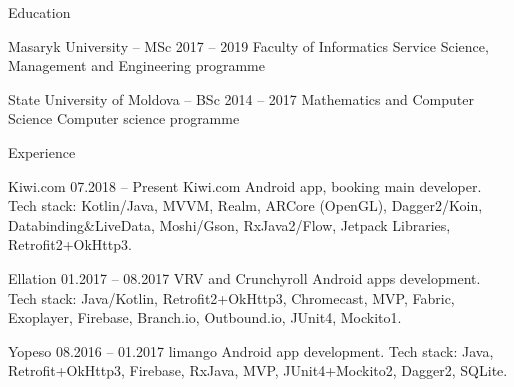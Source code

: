 \documentclass[12pt, a4paper]{article}
\begin{document}
\begin{minipage}[t]{0.6\textwidth}
    \raisebox{-.25\height}{} Education
    
    \bigskip
    
    Masaryk University – MSc \hfill 2017 – 2019 \newline
    Faculty of Informatics \newline
    Service Science, Management and Engineering programme
    
    \bigskip
    
    State University of Moldova – BSc \hfill 2014 – 2017 \newline
    Mathematics and Computer Science \newline
    Computer science programme
    
    \bigskip
    
    \raisebox{-.25\height}{} Experience
    
    \bigskip
    
    Kiwi.com \hfill 07.2018 – Present \newline
    Kiwi.com Android app, booking main developer. \newline
    Tech stack: Kotlin/Java, MVVM, Realm, ARCore (OpenGL), \newline
    Dagger2/Koin, Databinding\&LiveData, Moshi/Gson, \newline
    RxJava2/Flow, Jetpack Libraries, Retrofit2+OkHttp3.
    
    \bigskip
    
    Ellation \hfill 01.2017 – 08.2017 \newline
    VRV and Crunchyroll Android apps development. \newline
    Tech stack: Java/Kotlin, Retrofit2+OkHttp3, Chromecast, MVP, \newline
    Fabric, Exoplayer, Firebase, Branch.io, Outbound.io, JUnit4, \newline
    Mockito1.
   
    \bigskip
    
    Yopeso \hfill 08.2016 – 01.2017 \newline
    limango Android app development. \newline
    Tech stack: Java, Retrofit+OkHttp3, Firebase, RxJava, MVP, \newline
    JUnit4+Mockito2, Dagger2, SQLite.
    
    \bigskip
    

\end{minipage}
\end{document}
